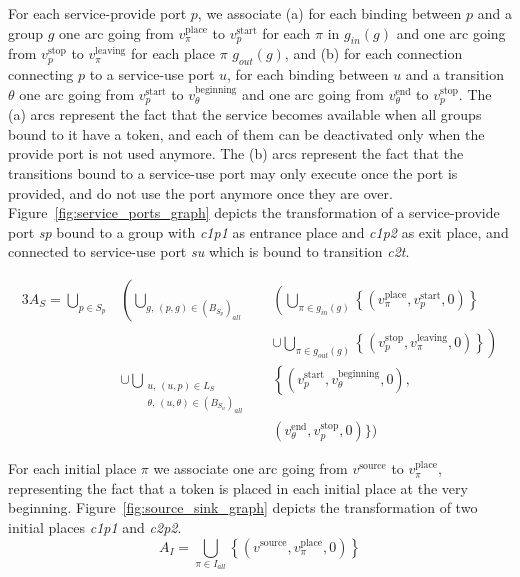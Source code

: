 

For each service-provide port $p$, we associate (a) for each binding between
$p$ and a group $g$ one arc going from $v_\pi^\text{place}$ to $v_p^\text{start}$
for each $\pi$ in $g_{in}(g)$ and one arc going from $v_p^\text{stop}$ to
$v_\pi^\text{leaving}$ for each place $\pi$ $g_{out}(g)$, and (b) for each
connection connecting $p$ to a service-use port $u$, for each binding between
$u$ and a transition $\theta$ one arc going from $v_p^\text{start}$ to
$v_\theta^\text{beginning}$ and one arc going from $v_\theta^\text{end}$ to
$v_p^\text{stop}$.
The (a) arcs represent the fact that the service becomes available when all
groups bound to it have a token, and each of them can be deactivated only when
the provide port is not used anymore. The (b) arcs represent the
fact that the transitions bound to a service-use port may only execute once
the port is provided, and do not use the port anymore once they are over.
Figure~\ref{fig:service_ports_graph} depicts the transformation of a
service-provide port \emph{sp} bound to a group with \emph{c1p1} as entrance
place and \emph{c1p2} as exit place, and connected to service-use port
\emph{su} which is bound to transition \emph{c2t}.

\begin{alignat*}{3}
A_{S}=\bigcup_{p\in S_p}
& \left(\bigcup_{g,\,\left(p,g\right)\in\left(B_{S_{p}}\right)_{all}} \right. && \left. \left(\bigcup_{\pi\in g_{in}(g)} \left\{\left(v_\pi^\text{place},v_p^\text{start},0\right)\right\}\right.\right. \\
&&& \left. \cup\left.\bigcup_{\pi\in g_{out}(g)} \left\{\left(v_p^\text{stop},v_\pi^\text{leaving},0\right)\right\}\right)\right. \\
& \left.\cup\bigcup_{\substack{u,\,\left(u,p\right)\in L_S \\ \theta,\,\left(u,\theta\right)\in\left(B_{S_{u}}\right)_{all}}} \right. && \left. \left\{ \left(v_p^\text{start},v_\theta^\text{beginning},0\right),\right.\right. \\
&&& \left.\left.\left(v_\theta^\text{end},v_p^\text{stop},0\right)\right.\Big\}\right.\Bigg)
\end{alignat*}



For each initial place $\pi$ we associate one arc going from $v^\text{source}$
 to $v_\pi^\text{place}$, representing the fact that a token is placed in each
 initial place at the very beginning.
Figure~\ref{fig:source_sink_graph} depicts the transformation of two initial
places \emph{c1p1} and \emph{c2p2}.
\[
A_{I}=\bigcup_{\pi\in I_{all}}\left\{ \left(v^\text{source},v_\pi^\text{place},0\right)\right\} 
\]

